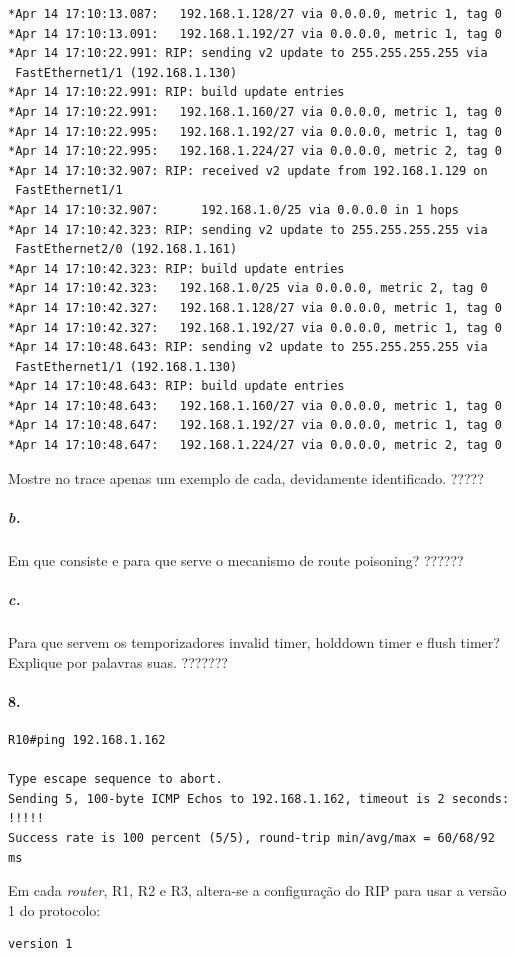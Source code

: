 \begin{verbatim}
*Apr 14 17:10:13.087: 	192.168.1.128/27 via 0.0.0.0, metric 1, tag 0
*Apr 14 17:10:13.091: 	192.168.1.192/27 via 0.0.0.0, metric 1, tag 0
*Apr 14 17:10:22.991: RIP: sending v2 update to 255.255.255.255 via
 FastEthernet1/1 (192.168.1.130)
*Apr 14 17:10:22.991: RIP: build update entries
*Apr 14 17:10:22.991: 	192.168.1.160/27 via 0.0.0.0, metric 1, tag 0
*Apr 14 17:10:22.995: 	192.168.1.192/27 via 0.0.0.0, metric 1, tag 0
*Apr 14 17:10:22.995: 	192.168.1.224/27 via 0.0.0.0, metric 2, tag 0
*Apr 14 17:10:32.907: RIP: received v2 update from 192.168.1.129 on
 FastEthernet1/1
*Apr 14 17:10:32.907:      192.168.1.0/25 via 0.0.0.0 in 1 hops
*Apr 14 17:10:42.323: RIP: sending v2 update to 255.255.255.255 via
 FastEthernet2/0 (192.168.1.161)
*Apr 14 17:10:42.323: RIP: build update entries
*Apr 14 17:10:42.323: 	192.168.1.0/25 via 0.0.0.0, metric 2, tag 0
*Apr 14 17:10:42.327: 	192.168.1.128/27 via 0.0.0.0, metric 1, tag 0
*Apr 14 17:10:42.327: 	192.168.1.192/27 via 0.0.0.0, metric 1, tag 0
*Apr 14 17:10:48.643: RIP: sending v2 update to 255.255.255.255 via
 FastEthernet1/1 (192.168.1.130)
*Apr 14 17:10:48.643: RIP: build update entries
*Apr 14 17:10:48.643: 	192.168.1.160/27 via 0.0.0.0, metric 1, tag 0
*Apr 14 17:10:48.647: 	192.168.1.192/27 via 0.0.0.0, metric 1, tag 0
*Apr 14 17:10:48.647: 	192.168.1.224/27 via 0.0.0.0, metric 2, tag 0
\end{verbatim}

 Mostre no trace apenas um exemplo de cada, devidamente identificado.  ?????
 
\subparagraph{b.}
 Em que consiste e para que serve o mecanismo de route poisoning?     ??????
 
\subparagraph{c.}
Para que servem os temporizadores invalid timer, holddown timer e flush timer? Explique por palavras suas.   ???????

\paragraph{8.}
\begin{verbatim}
R10#ping 192.168.1.162

Type escape sequence to abort.
Sending 5, 100-byte ICMP Echos to 192.168.1.162, timeout is 2 seconds:
!!!!!
Success rate is 100 percent (5/5), round-trip min/avg/max = 60/68/92 ms
\end{verbatim}

Em cada \emph{router}, \textsf{R1}, \textsf{R2} e \textsf{R3}, altera-se a configuração do RIP para usar a versão 1 do protocolo:
\begin{verbatim}
version 1
\end{verbatim}

